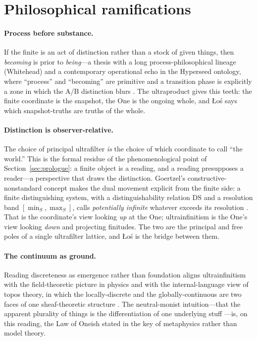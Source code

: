 \documentclass[]{article}
\theoremstyle{definition}
\theoremstyle{remark}
\begin{document}
\section{Philosophical ramifications}
\label{sec:philo}

\paragraph{Process before substance.} If the finite is an act of distinction rather
than a stock of given things, then \emph{becoming} is prior to \emph{being}---a
thesis with a long process-philosophical lineage (Whitehead) and a contemporary
operational echo in the Hyperseed ontology, where ``process'' and ``becoming'' are
primitive and a transition phase is explicitly a zone in which the
A/B distinction blurs \cite{Whitehead1929, GoertzelHyperseed}. The ultraproduct
gives this teeth: the finite coordinate is the snapshot, the One is the ongoing
whole, and {\L}o\'s says which snapshot-truths are truths of the whole.

\paragraph{Distinction is observer-relative.} The choice of principal ultrafilter
\emph{is} the choice of which coordinate to call ``the world.'' This is the formal
residue of the phenomenological point of Section~\ref{sec:prologue}: a finite
object is a reading, and a reading presupposes a reader---a perspective that draws
the distinction. Goertzel's constructive-nonstandard concept makes the dual
movement explicit from the finite side: a finite distinguishing system, with a
distinguishability relation $\mathrm{DS}$ and a resolution band $[\min_S,\max_S]$,
calls \emph{potentially infinite} whatever exceeds its resolution
\cite{GoertzelHyperseed}. That is the coordinate's view looking \emph{up} at the
One; ultrainfinitism is the One's view looking \emph{down} and projecting
finitudes. The two are the principal and free poles of a single ultrafilter
lattice, and {\L}o\'s is the bridge between them.

\paragraph{The continuum as ground.} Reading discreteness as emergence rather than
foundation aligns ultrainfinitism with the field-theoretic picture in physics and
with the internal-language view of topos theory, in which the locally-discrete and
the globally-continuous are two faces of one sheaf-theoretic structure
\cite{MacLaneMoerdijk1992}. The neutral-monist intuition---that the apparent
plurality of things is the differentiation of one underlying stuff
\cite{Russell1914}---is, on this reading, the Law of Oneish stated in the key of
metaphysics rather than model theory.
\end{document}
